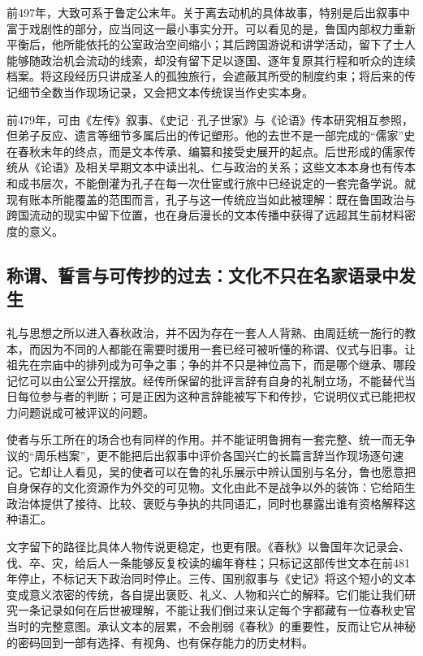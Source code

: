 前497年，大致可系于鲁定公末年。关于离去动机的具体故事，特别是后出叙事中富于戏剧性的部分，应当同这一最小事实分开。可以看见的是，鲁国内部权力重新平衡后，他所能依托的公室政治空间缩小；其后跨国游说和讲学活动，留下了士人能够随政治机会流动的线索，却没有留下足以逐国、逐年复原其行程和听众的连续档案。将这段经历只讲成圣人的孤独旅行，会遮蔽其所受的制度约束；将后来的传记细节全数当作现场记录，又会把文本传统误当作史实本身。

前479年，可由《左传》叙事、《史记·孔子世家》与《论语》传本研究相互参照，但弟子反应、遗言等细节多属后出的传记塑形。他的去世不是一部完成的“儒家”史在春秋末年的终点，而是文本传承、编纂和接受史展开的起点。后世形成的儒家传统从《论语》及相关早期文本中读出礼、仁与政治的关系；这些文本本身也有传本和成书层次，不能倒灌为孔子在每一次仕宦或行旅中已经说定的一套完备学说。就现有账本所能覆盖的范围而言，孔子与这一传统应当如此被理解：既在鲁国政治与跨国流动的现实中留下位置，也在身后漫长的文本传播中获得了远超其生前材料密度的意义。

\subsection{称谓、誓言与可传抄的过去：文化不只在名家语录中发生}

礼与思想之所以进入春秋政治，并不因为存在一套人人背熟、由周廷统一施行的教本，而因为不同的人都能在需要时援用一套已经可被听懂的称谓、仪式与旧事。让祖先在宗庙中的排列成为可争之事；争的并不只是神位高下，而是哪个继承、哪段记忆可以由公室公开摆放。经传所保留的批评言辞有自身的礼制立场，不能替代当日每位参与者的判断；可是正因为这种言辞能被写下和传抄，它说明仪式已能把权力问题说成可被评议的问题。

使者与乐工所在的场合也有同样的作用。并不能证明鲁拥有一套完整、统一而无争议的“周乐档案”，更不能把后出叙事中评价各国兴亡的长篇言辞当作现场逐句速记。它却让人看见，吴的使者可以在鲁的礼乐展示中辨认国别与名分，鲁也愿意把自身保存的文化资源作为外交的可见物。文化由此不是战争以外的装饰：它给陌生政治体提供了接待、比较、褒贬与争执的共同语汇，同时也暴露出谁有资格解释这种语汇。

文字留下的路径比具体人物传说更稳定，也更有限。《春秋》以鲁国年次记录会、伐、卒、灾，给后人一条能够反复校读的编年脊柱；只标记这部传世文本在前481年停止，不标记天下政治同时停止。三传、国别叙事与《史记》将这个短小的文本变成意义浓密的传统，各自提出褒贬、礼义、人物和兴亡的解释。它们能让我们研究一条记录如何在后世被理解，不能让我们倒过来认定每个字都藏有一位春秋史官当时的完整意图。承认文本的层累，不会削弱《春秋》的重要性，反而让它从神秘的密码回到一部有选择、有视角、也有保存能力的历史材料。

